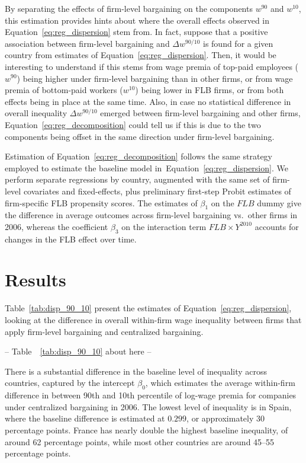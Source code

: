 \documentclass[12pt]{article}
\begin{document}
By separating the effects of firm-level bargaining on the components $w^{90}$ and $w^{10}$, this estimation provides hints about where the overall effects observed in Equation~\eqref{eq:reg_dispersion} stem from. In fact, suppose that a positive association between firm-level bargaining and $\Delta w^{90/10}$ is found for a given country from estimates of Equation~\eqref{eq:reg_dispersion}. Then, it would be interesting to understand if this stems from wage premia of top-paid employees ($w^{90}$) being higher under firm-level bargaining than in other firms, or from wage premia of bottom-paid workers ($w^{10}$) being lower in FLB firms, or from both effects being in place at the same time. Also, in case no statistical difference in overall inequality $\Delta w^{90/10}$ emerged between firm-level bargaining and other firms, Equation~\eqref{eq:reg_decomposition} could tell us if this is due to the two components being offset in the same direction under firm-level bargaining. 

Estimation of Equation~\eqref{eq:reg_decomposition} follows the same strategy employed to estimate the baseline model in~Equation~\eqref{eq:reg_dispersion}. We perform separate regressions by country, augmented with the same set of firm-level covariates and fixed-effects, plus preliminary first-step Probit estimates of firm-specific FLB propensity scores. The estimates of $\beta_1$ on the $\mathit{FLB}$ dummy give the difference in average outcomes across firm-level bargaining vs.~other firms in 2006, whereas the coefficient $\beta_3$ on the interaction term $\mathit{FLB} \times Y^{2010}$ accounts for changes in the FLB effect over time.


\section*{Results}
\label{sec:results}
Table~\ref{tab:disp_90_10} present the estimates of Equation~\eqref{eq:reg_dispersion}, looking at the difference in overall within-firm wage inequality between firms that apply firm-level bargaining and centralized bargaining.

\begin{center}
-- Table~~\ref{tab:disp_90_10} about here --
\end{center}

There is a substantial difference in the baseline level of inequality across countries, captured by the intercept $\beta_0$, which estimates the average within-firm difference in between 90th and 10th percentile of log-wage premia for companies under centralized bargaining in 2006. The lowest level of inequality is in Spain, where the baseline difference is estimated at $0.299$, or approximately 30 percentage points. France has nearly double the highest baseline inequality, of around 62 percentage points, while most other countries are around 45--55 percentage points.
\end{document}
